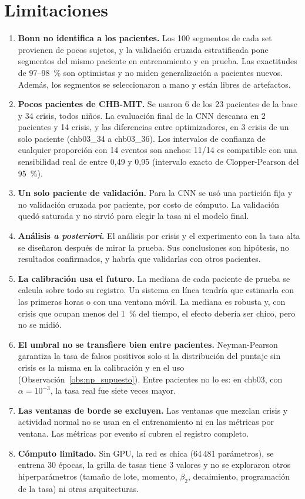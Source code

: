 \section{Limitaciones}

\begin{enumerate}
  \item \textbf{Bonn no identifica a los pacientes.} Los 100 segmentos de cada set provienen de pocos sujetos, y la validación
        cruzada estratificada pone segmentos del mismo paciente en entrenamiento y en prueba. Las exactitudes de 97--98~\%
        son optimistas y no miden generalización a pacientes nuevos. Además, los segmentos se seleccionaron a mano y están
        libres de artefactos.
  \item \textbf{Pocos pacientes de CHB-MIT.} Se usaron 6 de los 23 pacientes de la base y 34 crisis, todos niños. La
        evaluación final de la CNN descansa en 2 pacientes y 14 crisis, y las diferencias entre optimizadores, en 3 crisis de
        un solo paciente (chb03\_34 a chb03\_36). Los intervalos de confianza de cualquier proporción con 14 eventos son
        anchos: 11/14 es compatible con una sensibilidad real de entre 0,49 y 0,95 (intervalo exacto de Clopper-Pearson del
        95~\%).
  \item \textbf{Un solo paciente de validación.} Para la CNN se usó una partición fija y no validación cruzada por paciente,
        por costo de cómputo. La validación quedó saturada y no sirvió para elegir la tasa ni el modelo final.
  \item \textbf{Análisis \emph{a posteriori}.} El análisis por crisis y el experimento con la tasa alta se diseñaron después de
        mirar la prueba. Sus conclusiones son hipótesis, no resultados confirmados, y habría que validarlas con otros
        pacientes.
  \item \textbf{La calibración usa el futuro.} La mediana de cada paciente de prueba se calcula sobre todo su registro. Un
        sistema en línea tendría que estimarla con las primeras horas o con una ventana móvil. La mediana es robusta y, con
        crisis que ocupan menos del 1~\% del tiempo, el efecto debería ser chico, pero no se midió.
  \item \textbf{El umbral no se transfiere bien entre pacientes.} Neyman-Pearson garantiza la tasa de falsos positivos solo si
        la distribución del puntaje sin crisis es la misma en la calibración y en el uso (Observación~\ref{obs:np_supuesto}).
        Entre pacientes no lo es: en chb03, con $\alpha = 10^{-3}$, la tasa real fue siete veces mayor.
  \item \textbf{Las ventanas de borde se excluyen.} Las ventanas que mezclan crisis y actividad normal no se usan en el
        entrenamiento ni en las métricas por ventana. Las métricas por evento sí cubren el registro completo.
  \item \textbf{Cómputo limitado.} Sin GPU, la red es chica (64\,481 parámetros), se entrena 30 épocas, la grilla de tasas tiene
        3 valores y no se exploraron otros hiperparámetros (tamaño de lote, momento, $\beta_2$, decaimiento, programación de
        la tasa) ni otras arquitecturas.
\end{enumerate}

